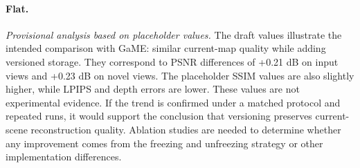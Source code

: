 \paragraph{Flat.}
\textit{Provisional analysis based on placeholder values.}
The draft values illustrate the intended comparison with GaME:
similar current-map quality while adding versioned storage.
They correspond to PSNR differences of
+0.21 dB on input views and +0.23 dB on novel views.
The placeholder SSIM values are also slightly higher,
while LPIPS and depth errors are lower.
These values are not experimental evidence.
If the trend is confirmed under a matched protocol and repeated runs,
it would support the conclusion that versioning preserves
current-scene reconstruction quality.
Ablation studies are needed to determine whether any improvement
comes from the freezing and unfreezing strategy or other
implementation differences.



